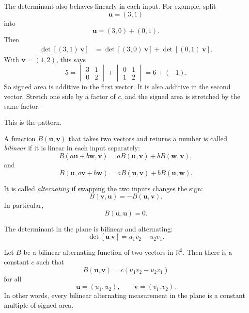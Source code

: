 The determinant also behaves linearly in each input.  For example, split
\[
    \mathbf u=(3,1)
\]
into
\[
    \mathbf u=(3,0)+(0,1).
\]
Then
\[
\begin{aligned}
\det[(3,1)\ \mathbf v]
&=
\det[(3,0)\ \mathbf v]
+
\det[(0,1)\ \mathbf v].
\end{aligned}
\]
With \(\mathbf v=(1,2)\), this says
\[
    5
    =
    \begin{vmatrix}
        3&1\\
        0&2
    \end{vmatrix}
    +
    \begin{vmatrix}
        0&1\\
        1&2
    \end{vmatrix}
    =
    6+(-1).
\]
So signed area is additive in the first vector.  It is also additive in the second vector.
Stretch one side by a factor of \(c\), and the signed area is stretched by the same factor.

This is the pattern.

\begin{definition}
A function \(B(\mathbf u,\mathbf v)\) that takes two vectors and returns a number is
called \emph{bilinear} if it is linear in each input separately:
\[
    B(a\mathbf u+b\mathbf w,\mathbf v)
    =
    aB(\mathbf u,\mathbf v)+bB(\mathbf w,\mathbf v),
\]
and
\[
    B(\mathbf u,a\mathbf v+b\mathbf w)
    =
    aB(\mathbf u,\mathbf v)+bB(\mathbf u,\mathbf w).
\]

It is called \emph{alternating} if swapping the two inputs changes the sign:
\[
    B(\mathbf v,\mathbf u)=-B(\mathbf u,\mathbf v).
\]
In particular,
\[
    B(\mathbf u,\mathbf u)=0.
\]
\end{definition}

The determinant in the plane is bilinear and alternating:
\[
    \det[\mathbf u\ \mathbf v]=u_1v_2-u_2v_1.
\]

\begin{theorem}
Let \(B\) be a bilinear alternating function of two vectors in \(\mathbb R^2\).  Then
there is a constant \(c\) such that
\[
\boxed{
    B(\mathbf u,\mathbf v)
    =
    c(u_1v_2-u_2v_1)
}
\]
for all
\[
    \mathbf u=(u_1,u_2),
    \qquad
    \mathbf v=(v_1,v_2).
\]
In other words, every bilinear alternating measurement in the plane is a constant
multiple of signed area.
\end{theorem}

